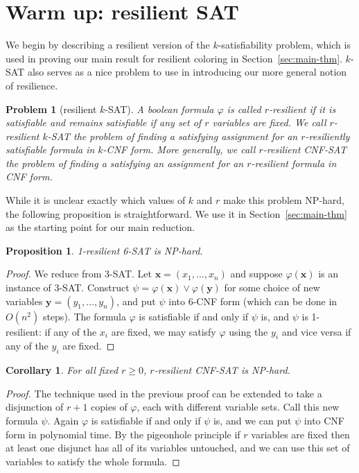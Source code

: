 \documentclass[10pt]{article}
\newtheorem{cor}{Corollary}
\newtheorem{propn}{Proposition}
\newtheorem*{prob}{Problem}
\begin{document}
\section{Warm up: resilient SAT}\label{sec:resilient-sat}

We begin by describing a resilient version of the $k$-satisfiability problem,
which is used in proving our main result for resilient coloring in Section~\ref{sec:main-thm}.
$k$-SAT also serves as a nice problem to use in introducing our more general notion of resilience.

\begin{prob}[resilient $k$-SAT]
A boolean formula $\varphi$ is called \emph{$r$-resilient} if it is satisfiable
and remains satisfiable if any set of $r$ variables are fixed. We call
\emph{$r$-resilient $k$-SAT} the problem of finding a satisfying assignment for
an $r$-resiliently satisfiable formula in $k$-CNF form. More generally, we call
$r$-resilient CNF-SAT the problem of finding a satisfying an assignment for an
$r$-resilient formula in CNF form.
\end{prob}

While it is unclear exactly which values of $k$ and $r$ make this problem
NP-hard, the following proposition is straightforward. We use it in
Section~\ref{sec:main-thm} as the starting point for our main reduction. 

\begin{propn}
1-resilient 6-SAT is NP-hard.
\end{propn}
\begin{proof}
We reduce from 3-SAT. Let $\mathbf{x} = (x_1, \dots, x_n)$ and suppose
$\varphi(\mathbf{x})$ is an instance of 3-SAT.  Construct $\psi =
\varphi(\mathbf{x}) \vee \varphi(\mathbf{y})$ for some choice of new variables
$\mathbf{y} = (y_1, \dots, y_n)$, and put $\psi$ into 6-CNF form (which can be done in $O(n^2)$
steps). The formula $\varphi$ is satisfiable if and only if $\psi$ is, and
$\psi$ is 1-resilient: if any of the $x_i$ are fixed, we may satisfy $\varphi$
using the $y_i$ and vice versa if any of the $y_i$ are fixed.  
\end{proof}

\begin{cor}
For all fixed $r \geq 0$, $r$-resilient CNF-SAT is NP-hard.
\end{cor}
\begin{proof}
The technique used in the previous proof can be extended to take a disjunction
of $r+1$ copies of $\varphi$, each with different variable sets. Call this new
formula $\psi$. Again $\varphi$ is satisfiable if and only if $\psi$ is, and we
can put $\psi$ into CNF form in polynomial time. By the pigeonhole principle if
$r$ variables are fixed then at least one disjunct has all of its variables
untouched, and we can use this set of variables to satisfy the whole formula.
\end{proof}
\end{document}
